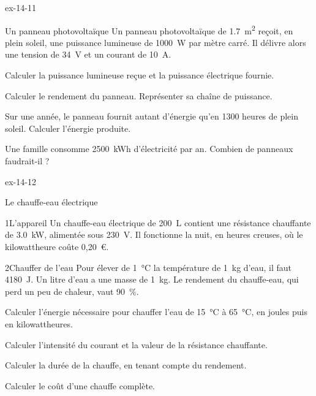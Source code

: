 \begin{blocLivre}{ex-14-11}
\begin{exercice}[2]{Un panneau photovoltaïque}
Un panneau photovoltaïque de \qty{1,7}{m^2} reçoit, en plein soleil, une puissance lumineuse de \qty{1000}{W} par mètre carré. Il délivre alors
une tension de \qty{34}{V} et un courant de \qty{10}{A}.
\begin{questions}
\item Calculer la puissance lumineuse reçue et la puissance électrique fournie.
\item Calculer le rendement du panneau. Représenter sa chaîne de puissance.
\item Sur une année, le panneau fournit autant d'énergie qu'en 1300 heures de plein soleil. Calculer l'énergie produite.
\item Une famille consomme \qty{2500}{kWh} d'électricité par an. Combien de panneaux faudrait-il ?
\end{questions}
\end{exercice}
\end{blocLivre}
\begin{blocLivre}{ex-14-12}
\begin{exercice}[3]{Le chauffe-eau électrique}
\begin{docu}{1}{L'appareil}
Un chauffe-eau électrique de \qty{200}{L} contient une résistance chauffante de \qty{3,0}{kW}, alimentée sous \qty{230}{V}. Il fonctionne la nuit, en
heures creuses, où le kilowattheure coûte 0,20~€.
\end{docu}
\begin{docu}{2}{Chauffer de l'eau}
Pour élever de \qty{1}{\degreeCelsius} la température de \qty{1}{kg} d'eau, il faut \qty{4180}{J}. Un litre d'eau a une masse de \qty{1}{kg}. Le rendement
du chauffe-eau, qui perd un peu de chaleur, vaut \qty{90}{\percent}.
\end{docu}
\begin{questions}
\item Calculer l'énergie nécessaire pour chauffer l'eau de \qty{15}{\degreeCelsius} à \qty{65}{\degreeCelsius}, en joules puis en kilowattheures.
\item Calculer l'intensité du courant et la valeur de la résistance chauffante.
\item \initiative Calculer la durée de la chauffe, en tenant compte du rendement.
\item Calculer le coût d'une chauffe complète.
\end{questions}
\end{exercice}
\end{blocLivre}
